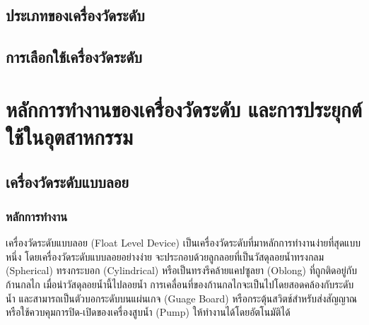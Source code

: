 \documentclass[final,11pt]{article}
\begin{document}
\subsection{ประเภทของเครื่องวัดระดับ}
\subsection{การเลือกใช้เครื่องวัดระดับ}

\newpage
\section{หลักการทำงานของเครื่องวัดระดับ และการประยุกต์ใช้ในอุตสาหกรรม}
\subsection{เครื่องวัดระดับแบบลอย}
\subsubsection{หลักการทำงาน} 
เครื่องวัดระดับแบบลอย (Float Level Device) เป็นเครื่องวัดระดับที่มาหลักการทำงานง่ายที่สุดแบบหนึ่ง
โดยเครื่องวัดระดับแบบลอยอย่างง่าย จะประกอบด้วยลูกลอยที่เป็นวัสดุลอยน้ำทรงกลม (Spherical) ทรงกระบอก (Cylindrical)
หรือเป็นทรงรีคล้ายแคปซูลยา (Oblong) ที่ถูกติดอยู่กับก้านกลไก เมื่อนำวัสดุลอยน้ำนี้ไปลอยน้ำ การเคลื่อนที่ของก้านกลไกจะเป็นไปโดยสอดคล้องกับระดับน้ำ
และสามารถเป็นตัวบอกระดับบนแผ่นเกจ (Guage Board) หรือกระตุ้นสวิตช์สำหรับส่งสัญญาณ หรือใช้ควบคุมการปิด-เปิดของเครื่องสูบน้ำ (Pump) ให้ทำงานได้โดยอัตโนมัติได้  
\end{document}
